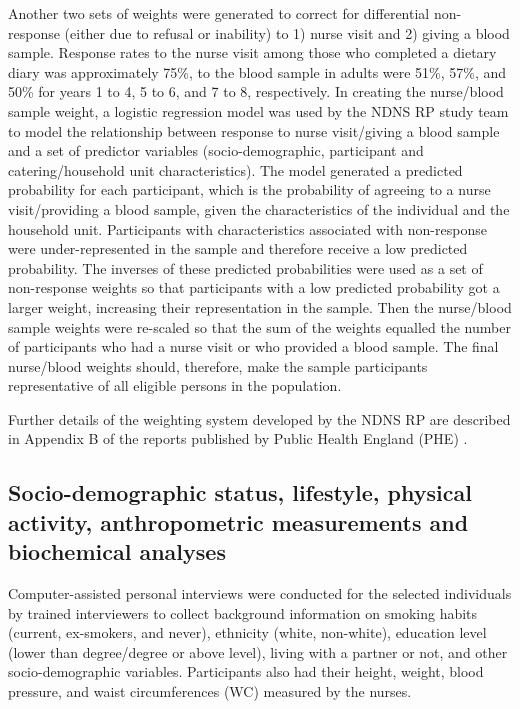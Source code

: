 Another two sets of weights were generated to correct for differential non-response (either due to refusal or inability) to 1) nurse visit and 2) giving a blood sample. Response rates to the nurse visit among those who completed a dietary diary was approximately 75\%, to the blood sample in adults were 51\%, 57\%, and 50\% for years 1 to 4, 5 to 6, and 7 to 8, respectively. In creating the nurse/blood sample weight, a logistic regression model was used by the NDNS RP study team to model the relationship between response to nurse visit/giving a blood sample and a set of predictor variables (socio-demographic, participant and catering/household unit characteristics). The model generated a predicted probability for each participant, which is the probability of agreeing to a nurse visit/providing a blood sample, given the characteristics of the individual and the household unit. Participants with characteristics associated with non-response were under-represented in the sample and therefore receive a low predicted probability. The inverses of these predicted probabilities were used as a set of non-response weights so that participants with a low predicted probability got a larger weight, increasing their representation in the sample. Then the nurse/blood sample weights were re-scaled so that the sum of the weights equalled the number of participants who had a nurse visit or who provided a blood sample. The final nurse/blood weights should, therefore, make the sample participants representative of all eligible persons in the population. 

Further details of the weighting system developed by the NDNS RP are described in Appendix B of the reports published by Public Health England (PHE) \parencite{bates2014national,roberts2018national,NDNSofficial}.\vspace{-0.6cm}

\subsection{Socio-demographic status, lifestyle, physical activity, anthropometric measurements and biochemical analyses}\vspace{-0.3cm}

Computer-assisted personal interviews were conducted for the selected individuals by trained interviewers to collect background information on smoking habits (current, ex-smokers, and never), ethnicity (white, non-white), education level (lower than degree/degree or above level), living with a partner or not, and other socio-demographic variables. Participants also had their height, weight, blood pressure, and waist circumferences (WC) measured by the nurses. 

